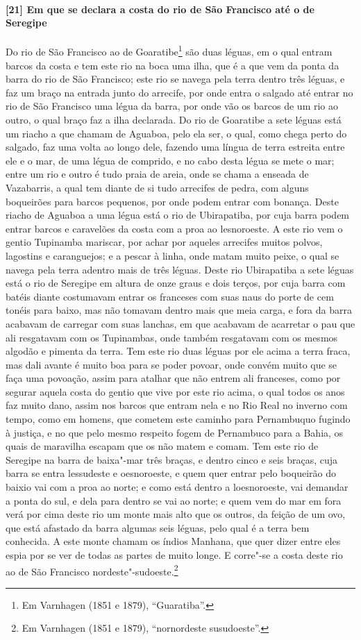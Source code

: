 \paragraph{[21] Em que se declara a costa do rio de São Francisco até o de Seregipe} \quad
Do rio de São Francisco ao de Goaratibe\footnote{ Em Varnhagen (1851 e 1879),
``Guaratiba''.} são duas léguas, em o qual entram barcos da costa e tem este rio na boca
uma ilha, que é a que vem da ponta da barra do rio de São Francisco; este rio se navega
pela terra dentro três léguas, e faz um braço na entrada junto do arrecife, por onde entra
o salgado até entrar no rio de São Francisco uma légua da barra, por onde vão os barcos de
um rio ao outro, o qual braço faz a ilha declarada. Do rio de Goaratibe a sete léguas está
um riacho a que chamam de Aguaboa, pelo ela ser, o qual, como chega perto do salgado, faz
uma volta ao longo dele, fazendo uma língua de terra estreita entre ele e o mar, de uma
légua de comprido, e no cabo desta légua se mete o mar; entre um rio e outro é tudo praia
de areia, onde se chama a enseada de Vazabarris, a qual tem diante de si tudo arrecifes de
pedra, com alguns boqueirões para barcos pequenos, por onde podem entrar com bonança.
Deste riacho de Aguaboa a uma légua está o rio de Ubirapatiba, por cuja barra podem entrar
barcos e caravelões da costa com a proa ao lesnoroeste. A este rio vem o gentio Tupinamba
mariscar, por achar por aqueles arrecifes muitos polvos, lagostins e caranguejos; e a
pescar à linha, onde matam muito peixe, o qual se navega pela terra adentro mais de três
léguas. Deste rio Ubirapatiba a sete léguas está o rio de Seregipe em altura de onze graus
e dois terços, por cuja barra com batéis diante costumavam entrar os franceses com suas
naus do porte de cem tonéis para baixo, mas não tomavam dentro mais que meia carga, e fora
da barra acabavam de carregar com suas lanchas, em que acabavam de acarretar o pau que ali
resgatavam com os Tupinambas, onde também resgatavam com os mesmos algodão e pimenta da
terra. Tem este rio duas léguas por ele acima a terra fraca, mas dali avante é muito boa
para se poder povoar, onde convém muito que se faça uma povoação, assim para atalhar que
não entrem ali franceses, como por segurar aquela costa do gentio que vive por este rio
acima, o qual todos os anos faz muito dano, assim nos barcos que entram nela e no Rio Real
no inverno com tempo, como em homens, que cometem este caminho para Pernambuquo fugindo à
justiça, e no que pelo mesmo respeito fogem de Pernambuco para a Bahia, os quais de
maravilha escapam que os não matem e comam. Tem este rio de Seregipe na barra de baixa"-mar
três braças, e dentro cinco e seis braças, cuja barra se entra lessudeste e oesnoroeste, e
quem quer entrar pelo boqueirão do baixio vai com a proa ao norte; e como está dentro a
loesnoroeste, vai demandar a ponta do sul, e dela para dentro se vai ao norte; e quem vem
do mar em fora verá por cima deste rio um monte mais alto que os outros, da feição de um
ovo, que está afastado da barra algumas seis léguas, pelo qual é a terra bem conhecida. A
este monte chamam os índios Manhana, que quer dizer entre eles espia por se ver de todas
as partes de muito longe. E corre"-se a costa deste rio ao de São Francisco
nordeste"-sudoeste.\footnote{ Em Varnhagen (1851 e 1879), ``nornordeste susudoeste''.}

